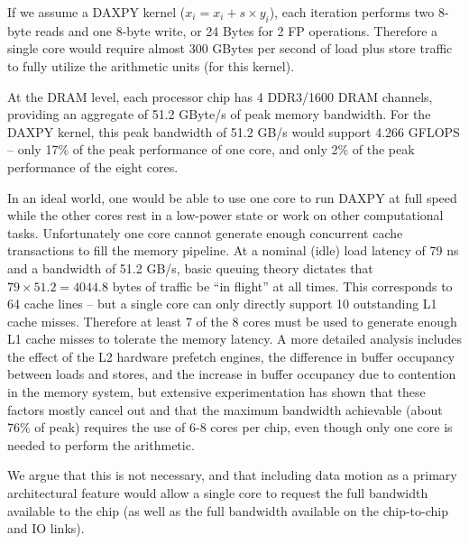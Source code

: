 If we assume a DAXPY kernel ($x_i = x_i + s \times y_i$), each iteration performs 
two 8-byte reads and one 8-byte write, or 24 Bytes for 2 FP operations.  
Therefore a single core would require almost 300 GBytes per second of load plus store 
traffic to fully utilize the arithmetic units (for this kernel).   

At the DRAM level, each processor chip has 4 DDR3/1600 DRAM channels, 
providing an aggregate of 51.2 GByte/s of peak memory bandwidth.    
For the DAXPY kernel, this peak bandwidth of 51.2 GB/s would support 4.266 GFLOPS 
-- only 17\% of the peak performance of one core, and only 2\% of the peak performance of the
eight cores.

In an ideal world, one would be able to use one core to run DAXPY at full speed while 
the other cores rest in a low-power state or work on other computational tasks.  
Unfortunately one core cannot generate enough
concurrent cache transactions to fill the memory pipeline.   At a nominal (idle) load latency of
79 ns and a bandwidth of 51.2 GB/s, basic queuing theory dictates that $79\times 51.2 = 4044.8$ 
bytes of traffic be ``in flight'' at all times.  This corresponds to 64 cache lines -- but a single 
core can only directly support 10 outstanding L1 cache misses\cite{IntelSWOptGuide}.  
Therefore at least 7 of the 8 cores must be used to generate enough L1 cache misses
to tolerate the memory latency.  A more detailed analysis includes the effect of the 
L2 hardware prefetch engines, the difference in buffer occupancy between loads and stores,
and the increase in buffer occupancy due to contention in the memory system, but extensive
experimentation has shown that these factors mostly cancel out and that the maximum 
bandwidth achievable (about 76\% of peak) requires the use of 6-8 cores per chip, even 
though only one core is needed to perform the arithmetic.   

We argue that this is not necessary, and that including data motion as a primary
architectural feature would allow a single core to request the full bandwidth available
to the chip (as well as the full bandwidth available on the chip-to-chip and IO links).


\begin{comment}
Power measurements show a consumption of 100 Watts when running this benchmark,
with 72 Watts consumed by the 8 cores, 17 Watts by the L3 cache, memory controller, and 
QPI interconnect, and 11 Watts used by the DRAM.  
\end{comment}


